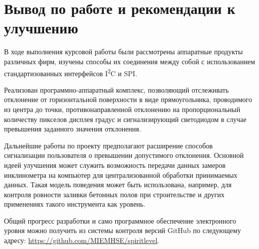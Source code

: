 \documentclass[document.tex]{subfiles}
\begin{document}
\section{Вывод по работе и рекомендации к улучшению}
В ходе выполнения курсовой работы были рассмотрены аппаратные продукты различных фирм, изучены способы их соединения между собой с использованием стандартизованных интерфейсов
I\textsuperscript{2}C и SPI.

Реализован программно-аппаратный комплекс, позволяющий отслеживать отклонение от горизонтальной поверхности в виде прямоугольника, проводимого из центра до точки,
противонаправленной отклонению на пропорциональный количеству пикселов дисплея градус и сигнализирующий светодиодом в случае превышения заданного значения отклонения.
 
Дальнейшие работы по проекту предполагают расширение способов сигнали\-зации пользо\-вателя о превышении допустимого отклонения. Основной идеей улучшения может служить возможность
передачи данных замеров инклинометра на компьютер для централизованной обработки принимаемых данных. Такая модель поведения может быть использована, напри\-мер, для контроля
ровности заливки бетонных полов при строительстве и других применени\-ях такого инстру\-мента как уровень.

Общий прогресс разработки и само программное обеспечение электронного уровня можно получить из
системы контроля версий GitHub по следующему адресу: {\url{https://github.com/MIEMHSE/spiritlevel}}.
\end{document}

